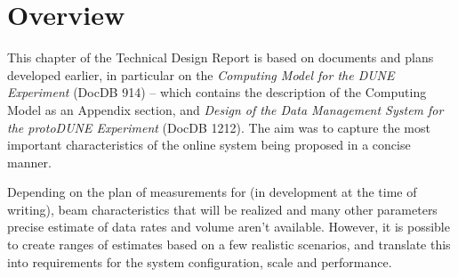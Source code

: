 \section{Overview}
This chapter of the Technical Design Report is based on documents and plans developed earlier, in particular
on the \textit{Computing Model for the DUNE Experiment} (DocDB 914) -- which contains the description
of the \pd Computing Model as an Appendix section, and \textit{Design of the Data Management System for the protoDUNE Experiment}
(DocDB 1212). The aim was to capture the most important characteristics of the online system being proposed in a concise manner.

Depending on the plan of measurements for \pd (in development at the time of writing), beam characteristics that will be realized
and many other parameters precise estimate of data rates and volume aren't available. However, it is possible to create ranges
of estimates based on a few realistic scenarios, and translate this into requirements for the system configuration, scale and
performance.

